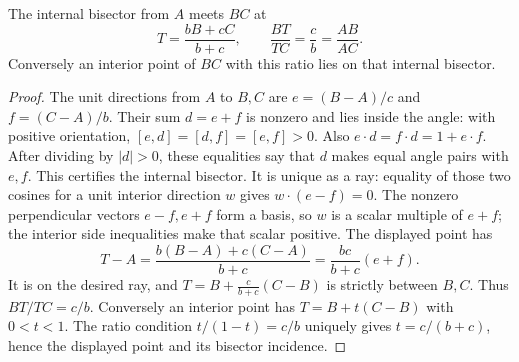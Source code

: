 \begin{theorem}
\label{tri:bisector}
The internal bisector from $A$ meets $BC$ at
\[
 T=\frac{bB+cC}{b+c},\qquad \frac{BT}{TC}=\frac cb=\frac{AB}{AC}.
\]
Conversely an interior point of $BC$ with this ratio lies on that
internal bisector.
\end{theorem}
\begin{proof}
The unit directions from $A$ to $B,C$ are $e=(B-A)/c$ and
$f=(C-A)/b$.  Their sum $d=e+f$ is nonzero and lies inside the angle:
with positive orientation, $[e,d]=[d,f]=[e,f]>0$.
Also $e\mathbin{\cdot}d=f\mathbin{\cdot}d=1+e\mathbin{\cdot}f$.
After dividing by $|d|>0$, these equalities say that $d$ makes equal
angle pairs with $e,f$.  This certifies the internal bisector.  It is
unique as a ray: equality of those two cosines for a unit interior
direction $w$ gives $w\mathbin{\cdot}(e-f)=0$.  The nonzero perpendicular
vectors $e-f,e+f$ form a basis, so $w$ is a scalar multiple of $e+f$;
the interior side inequalities make that scalar positive.
The displayed point has
\[
 T-A=\frac{b(B-A)+c(C-A)}{b+c}
     =\frac{bc}{b+c}(e+f).
\]
It is on the desired ray, and $T=B+\frac c{b+c}(C-B)$ is strictly
between $B,C$.  Thus $BT/TC=c/b$.
Conversely an interior point has $T=B+t(C-B)$ with $0<t<1$.
The ratio condition $t/(1-t)=c/b$ uniquely gives $t=c/(b+c)$, hence
the displayed point and its bisector incidence.
\end{proof}

